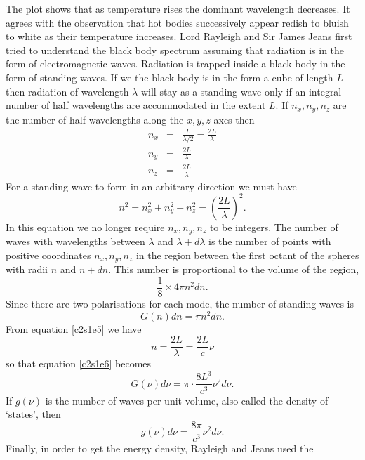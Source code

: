 The plot shows that as temperature
rises the dominant wavelength decreases. It agrees with the observation that
hot bodies successively appear redish to bluish to white as their temperature
increases. Lord Rayleigh and Sir James Jeans first tried to understand the
black body spectrum assuming that radiation is in the form of electromagnetic
waves. Radiation is trapped inside a black body in the form of standing waves.
If we the black body is in the form a cube of length $L$ then radiation of 
wavelength $\lambda$ will stay as a standing wave only if an integral number of
half wavelengths are accommodated in the extent $L$. If $n_x, n_y, n_z$ are the
number of half-wavelengths along the $x, y, z$ axes then
\begin{eqnarray}
n_x &=& \frac{L}{\lambda/2} = \frac{2L}{\lambda} \\
n_y &=& \frac{2L}{\lambda} \\
n_z &=& \frac{2L}{\lambda}
\end{eqnarray}
For a standing wave to form in an arbitrary direction we must have
\begin{equation}\label{c2s1e5}
n^2 = n_x^2 + n_y^2 + n_z^2 = \left(\frac{2L}{\lambda}\right)^2.
\end{equation}
In this equation we no longer require $n_x, n_y, n_z$ to be integers.
The number of waves with wavelengths between $\lambda$ and $\lambda + d\lambda$
is the number of points with positive coordinates $n_x, n_y, n_z$ in the region
between the first octant of the spheres with radii $n$ and $n + dn$. This number
is proportional to the volume of the region,
\[
\frac{1}{8} \times 4\pi n^2dn.
\]
Since there are two polarisations for each mode, the number of standing waves is
\begin{equation}\label{c2s1e6}
G(n)dn = \pi n^2 dn.
\end{equation}
From equation \eqref{c2s1e5} we have
\begin{equation}\label{c2s1e7}
n = \frac{2L}{\lambda} = \frac{2L}{c}\nu
\end{equation}
so that equation \eqref{c2s1e6} becomes
\begin{equation}\label{c2s1e8}
G(\nu)d\nu = \pi \cdot \frac{8L^3}{c^3}\nu^2d\nu.
\end{equation}
If $g(\nu)$ is the number of waves per unit volume, also called the density of
`states', then
\begin{equation}\label{c2e1e9}
g(\nu)d\nu = \frac{8\pi}{c^3}\nu^2 d\nu.
\end{equation}
Finally, in order to get the energy density, Rayleigh and Jeans used the 
